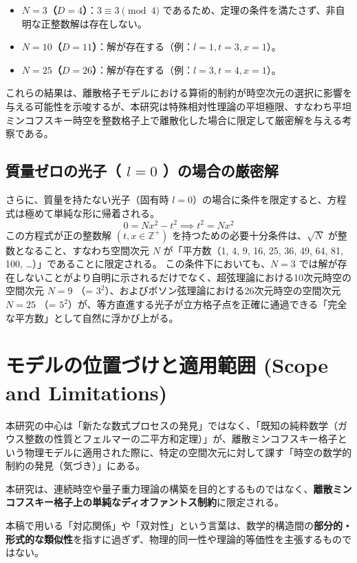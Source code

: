 \documentclass[a4paper,11pt]{ltjsarticle}
\begin{document}
\begin{itemize}
    \item \textbf{\(N=3\)（\(D=4\)）}：\(3 \equiv 3 \pmod{4}\) であるため、定理の条件を満たさず、非自明な正整数解は存在しない。
    \item \textbf{\(N=10\)（\(D=11\)）}：解が存在する（例：\(l=1, t=3, x=1\)）。
    \item \textbf{\(N=25\)（\(D=26\)）}：解が存在する（例：\(l=3, t=4, x=1\)）。
\end{itemize}

これらの結果は、離散格子モデルにおける算術的制約が時空次元の選択に影響を与える可能性を示唆するが、本研究は特殊相対性理論の平坦極限、すなわち平坦ミンコフスキー時空を整数格子上で離散化した場合に限定して厳密解を与える考察である。

\subsection{質量ゼロの光子（ $l=0$ ）の場合の厳密解}

さらに、質量を持たない光子（固有時 $l=0$）の場合に条件を限定すると、方程式は極めて単純な形に帰着される。
\[ 0 = N x^2 - t^2 \implies t^2 = N x^2 \]
この方程式が正の整数解 $(t, x \in \mathbb{Z}^+)$ を持つための必要十分条件は、$\sqrt{N}$ が整数となること、すなわち空間次元 $N$ が「平方数（1, 4, 9, 16, 25, 36, 49, 64, 81, 100, \dots）」であることに限定される。
この条件下においても、$N=3$ では解が存在しないことがより自明に示されるだけでなく、超弦理論における10次元時空の空間次元 $N=9$ （= $3^2$）、およびボソン弦理論における26次元時空の空間次元 $N=25$ （= $5^2$）が、等方直進する光子が立方格子点を正確に通過できる「完全な平方数」として自然に浮かび上がる。

\section{モデルの位置づけと適用範囲 (Scope and Limitations)}
本研究の中心は「新たな数式プロセスの発見」ではなく、「既知の純粋数学（ガウス整数の性質とフェルマーの二平方和定理）」が、離散ミンコフスキー格子という物理モデルに適用された際に、特定の空間次元に対して課す「時空の数学的制約の発見（気づき）」にある。

本研究は、連続時空や量子重力理論の構築を目的とするものではなく、\textbf{離散ミンコフスキー格子上の単純なディオファントス制約}に限定される。

本稿で用いる「対応関係」や「双対性」という言葉は、数学的構造間の\textbf{部分的・形式的な類似性}を指すに過ぎず、物理的同一性や理論的等価性を主張するものではない。
\end{document}
